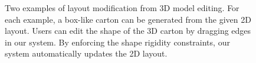 \begin{figure}
	\centering
	\hspace{4ex}
	\caption{Two examples of layout modification from 3D model editing. For each example, a box-like carton can be generated from the given 2D layout. Users can edit the shape of the 3D carton by dragging edges in our system. By enforcing the shape rigidity constraints, our system automatically updates the 2D layout. }
	\label{fig:editing}
\end{figure}

 
